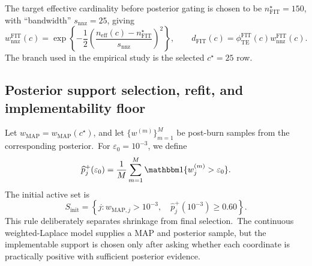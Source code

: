 \documentclass[11pt]{article}
\begin{document}
The target effective cardinality before posterior gating is chosen to be \(n_{\mathrm{FIT}}^\star=150\), with ``bandwidth'' \(s_{\mathrm{nnz}}=25\), giving
\begin{equation}
  w^{\mathrm{FIT}}_{\mathrm{nnz}}(c)
  =
  \exp\left\{-\frac12
  \left(
  \frac{n_{\mathrm{eff}}(c)-n_{\mathrm{FIT}}^\star}{s_{\mathrm{nnz}}}
  \right)^2
  \right\},
  \qquad
  d_{\mathrm{FIT}}(c)=\phi^{\mathrm{FIT}}_{\mathrm{TE}}(c)w^{\mathrm{FIT}}_{\mathrm{nnz}}(c).
  \label{eq:workflow-construction-score}
\end{equation}
The branch used in the empirical study is the selected \(c^\star=25\) row.\ 

\subsection{Posterior support selection, refit, and implementability floor}\label{subsec:workflow-support-refit-floor}

Let \(w_{\mathrm{MAP}}=w_{\mathrm{MAP}}(c^\star)\), and let \(\{w^{(m)}\}_{m=1}^M\) be post-burn samples from the corresponding posterior.\ For \(\varepsilon_0=10^{-3}\), we define
\begin{equation}
  \widehat p_j^+(\varepsilon_0)
  =
  \frac1M\sum_{m=1}^M
  \mathbbm 1\{w_j^{(m)}>\varepsilon_0\}.
  \label{eq:workflow-practical-positive}
\end{equation}
The initial active set is
\begin{equation}
  S_{\mathrm{init}}
  =
  \left\{
  j:
  w_{\mathrm{MAP},j}>10^{-3},\quad
  \widehat p_j^+(10^{-3})\geq 0.60
  \right\}.
  \label{eq:workflow-initial-support}
\end{equation}
This rule deliberately separates shrinkage from final selection.\ The continuous weighted-Laplace model supplies a MAP and posterior sample, but the implementable support is chosen only after asking whether each coordinate is practically positive with sufficient posterior evidence.
\end{document}
